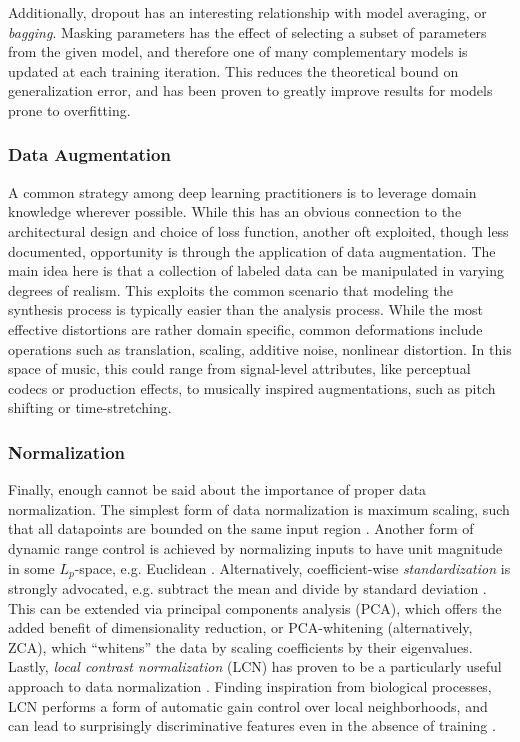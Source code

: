 Additionally, dropout has an interesting relationship with model averaging, or \emph{bagging}.
Masking parameters has the effect of selecting a subset of parameters from the given model, and therefore one of many complementary models is updated at each training iteration.
This reduces the theoretical bound on generalization error, and has been proven to greatly improve results for models prone to overfitting.


\subsubsection{Data Augmentation}

A common strategy among deep learning practitioners is to leverage domain knowledge wherever possible.
While this has an obvious connection to the architectural design and choice of loss function, another oft exploited, though less documented, opportunity is through the application of data augmentation.
The main idea here is that a collection of labeled data can be manipulated in varying degrees of realism.
This exploits the common scenario that modeling the synthesis process is typically easier than the analysis process.
While the most effective distortions are rather domain specific, common deformations include operations such as translation, scaling, additive noise, nonlinear distortion.
In this space of music, this could range from signal-level attributes, like perceptual codecs or production effects, to musically inspired augmentations, such as pitch shifting or time-stretching.


\subsubsection{Normalization}

Finally, enough cannot be said about the importance of proper data normalization.
The simplest form of data normalization is maximum scaling, such that all datapoints are bounded on the same input region \cite{MNIST}.
Another form of dynamic range control is achieved by normalizing inputs to have unit magnitude in some $L_p$-space, e.g. Euclidean \cite{Koray}.
Alternatively, coefficient-wise \emph{standardization} is strongly advocated, e.g. subtract the mean and divide by standard deviation \cite{LeCun}.
This can be extended via principal components analysis (PCA), which offers the added benefit of dimensionality reduction, or PCA-whitening (alternatively, ZCA), which ``whitens'' the data by scaling coefficients by their eigenvalues.
Lastly, \emph{local contrast normalization} (LCN) has proven to be a particularly useful approach to data normalization \cite{LeCun}.
Finding inspiration from biological processes, LCN performs a form of automatic gain control over local neighborhoods, and can lead to surprisingly discriminative features even in the absence of training \cite{Koray}.

